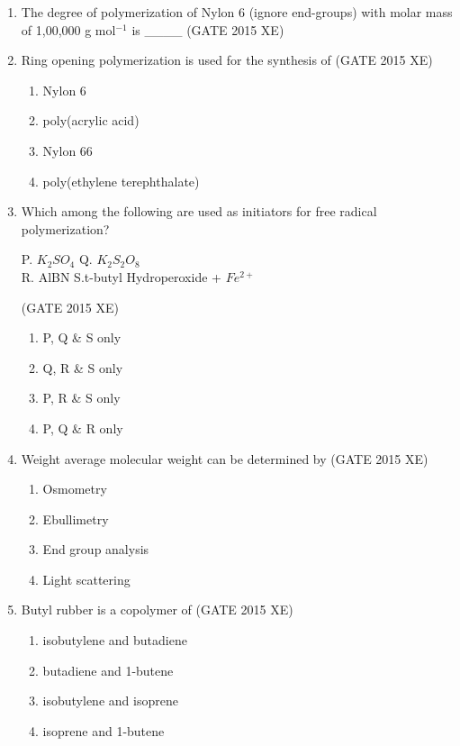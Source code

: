 \documentclass[journal,12pt,onecolumn]{IEEEtran}
\begin{document}
\begin{enumerate}
\item The degree of polymerization of Nylon 6 (ignore end-groups) with molar mass of 1,00,000 g mol$^{-1}$ is \_\_\_\_
\hfill{(GATE 2015 XE)} \\


\item Ring opening polymerization is used for the synthesis of
\hfill{(GATE 2015 XE)} \\
\begin{multicols}{2}
\begin{enumerate}
\item Nylon 6
\item poly(acrylic acid)
\item Nylon 66
\item poly(ethylene terephthalate)
\end{enumerate}
\end{multicols}


\item Which among the following are used as initiators for free radical polymerization?

P. $K_2SO_4$ \quad Q. $K_2S_2O_8$ \\
R. AlBN  \quad S.t-butyl Hydroperoxide + $Fe^{2+}$

 \hfill{(GATE 2015 XE)} \\
 \begin{multicols}{4}
\begin{enumerate}
\item P, Q \& S only
\item Q, R \& S only
\item P, R \& S only
\item P, Q \& R only
\end{enumerate}
\end{multicols}


\item Weight average molecular weight can be determined by
\hfill{(GATE 2015 XE)} \\
\begin{multicols}{4}
\begin{enumerate}
\item Osmometry
\item Ebullimetry
\item End group analysis
\item Light scattering
\end{enumerate}
\end{multicols}

\item Butyl rubber is a copolymer of
\hfill{(GATE 2015 XE)} \\
\begin{multicols}{2}
\begin{enumerate}
\item isobutylene and butadiene
\item butadiene and 1-butene
\item isobutylene and isoprene
\item isoprene and 1-butene
\end{enumerate}
\end{multicols}


\end{enumerate}
\end{document}
